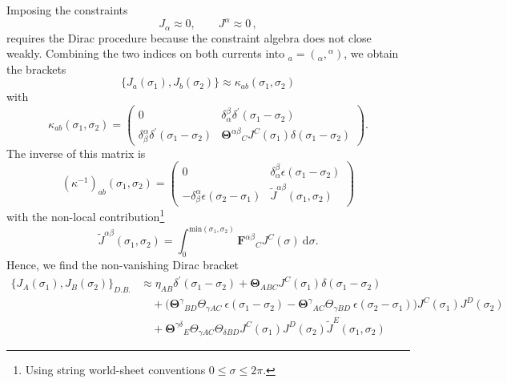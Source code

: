 \documentclass[11pt,a4paper]{article}
\numberwithin{equation}{section}
\begin{document}
Imposing the constraints
\begin{equation}
	J_\alpha \approx 0, \qquad J^\alpha \approx 0\,,
\end{equation}
requires the Dirac procedure because the constraint algebra does not close weakly. Combining the two indices on both currents into ${}_a = ({}_\alpha , {}^\alpha)$, we obtain the brackets
\begin{equation}
	\{J_a (\sigma_1) , J_b (\sigma_2) \} \approx \kappa_{ab}(\sigma_1,\sigma_2)
\end{equation}
with
\begin{equation}
	\kappa_{ab}(\sigma_1,\sigma_2) = \left( \begin{array}{cc} 0 & \delta_\alpha^\beta \delta^\prime(\sigma_1 - \sigma_2) \\
	\delta_\beta^\alpha \delta^\prime(\sigma_1 - \sigma_2) & {\mathbf{\Theta}^{\alpha \beta}}_{C} J^C (\sigma_1) \delta(\sigma_1 - \sigma_2) \end{array} \right).
\end{equation}
The inverse of this matrix is
\begin{equation}
	(\kappa^{-1})_{ab}(\sigma_1 , \sigma_2) = \left( \begin{array}{cc} 0 & \delta_{\alpha}^\beta \epsilon(\sigma_1 - \sigma_2) \\
	- \delta^\alpha_\beta \epsilon(\sigma_2 - \sigma_1) & \tilde{J}^{\alpha \beta} (\sigma_1 , \sigma_2)
	\end{array} \right)
\end{equation}
with the non-local contribution\footnote{Using string world-sheet conventions $0 \leq \sigma \leq 2\pi$.}
\begin{equation}
	\tilde{J}^{\alpha\beta}(\sigma_1, \sigma_2) = \int^{\text{min}(\sigma_1,\sigma_2)}_0 {\mathbf{F}^{\alpha \beta}}_{C} J^C(\sigma) \ \mathrm{d}\sigma.
\end{equation}
Hence, we find the non-vanishing Dirac bracket
\begin{equation}\label{eq:DiracBracket}
    \begin{aligned}
	    \{ J_A (\sigma_1) , J_B (\sigma_2) \}_{D.B.} &\approx \eta_{AB} \delta^\prime(\sigma_1 - \sigma_2) + \mathbf{\Theta}_{ABC} J^C(\sigma_1) \delta(\sigma_1-\sigma_2) \\
	    &{} \quad + \Big( {\mathbf{\Theta}^\gamma}_{BD} \Theta_{\gamma AC} \ \epsilon(\sigma_1-\sigma_2) - {\mathbf{\Theta}^\gamma}_{AC} \Theta_{\gamma BD} \ \epsilon(\sigma_2-\sigma_1) \Big) J^C(\sigma_1) J^D(\sigma_2) \\
	    &{} \quad + {\mathbf{\Theta}^{\gamma\delta}}_E \Theta_{\gamma AC} \Theta_{\delta BD} J^C(\sigma_1) J^D(\sigma_2) \tilde{J}^E(\sigma_1,\sigma_2)
    \end{aligned}
\end{equation}
\end{document}
